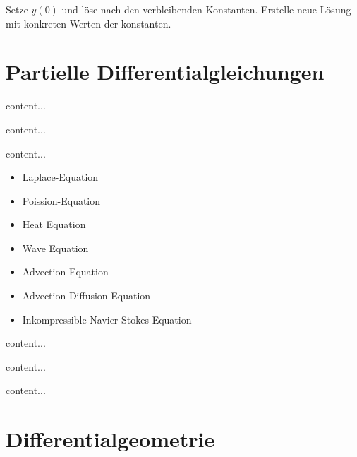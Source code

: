 \begin{definition}[Anfangswertproblem]
	Setze $y(0)$ und löse nach den verbleibenden Konstanten. Erstelle neue Lösung mit konkreten Werten der konstanten.
\end{definition}

\pagebreak

\section{Partielle Differentialgleichungen}

\begin{definition}
	content...
\end{definition}

\begin{definition}
	content...
\end{definition}

\begin{definition}
	content...
\end{definition}

\begin{definition}
	\begin{itemize}
		\item Laplace-Equation
		\item Poission-Equation
		\item Heat Equation
		\item Wave Equation
		\item Advection Equation
		\item Advection-Diffusion Equation
		\item Inkompressible Navier Stokes Equation 
	\end{itemize}
\end{definition}

\begin{satz}
	content...
\end{satz}

\begin{satz}
	content...
\end{satz}

\begin{satz}
	content...
\end{satz}


\pagebreak

\section{Differentialgeometrie}


